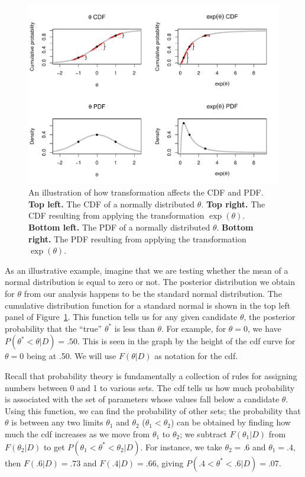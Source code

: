 \documentclass[man]{apa}
\begin{document}
\begin{figure}[t]
    \centering
    \includegraphics[width=.85\textwidth]{idunno.pdf}
    \caption{An illustration of how transformation affects the CDF and PDF. \textbf{Top left.} The CDF of a normally distributed $\theta$. \textbf{Top right.} The CDF resulting from applying the transformation $\exp(\theta)$. \textbf{Bottom left.} The PDF of a normally distributed $\theta$. \textbf{Bottom right.} The PDF resulting from applying the transformation $\exp(\theta)$.}
    \label{fig:normals}
\end{figure}

As an illustrative example, imagine that we are testing whether the mean of a normal distribution is equal to zero or not. The posterior distribution we obtain for $\theta$ from our analysis happens to be the standard normal distribution. The cumulative distribution function for a standard normal is shown in the top left panel of Figure~\ref{fig:normals}. This function tells us for any given candidate $\theta$, the posterior probability that the ``true'' $\theta^*$ is less than $\theta$. For example, for $\theta=0$, we have $P(\theta^*<\theta|D) = .50$. This is seen in the graph by the height of the cdf curve for $\theta=0$ being at .50. We will use $F(\theta|D)$ as notation for the cdf.

Recall that probability theory is fundamentally a collection of rules for assigning numbers between 0 and 1 to various sets. The cdf tells us how much probability is associated with the set of parameters whose values fall below a candidate $\theta$. Using this function, we can find the probability of other sets; the probability that $\theta$ is between any two limits $\theta_1$ and $\theta_2$ ($\theta_1<\theta_2$) can be obtained by finding how much the cdf increases as we move from $\theta_1$ to $\theta_2$; we subtract $F(\theta_1|D)$ from $F(\theta_2|D)$ to get $P(\theta_1<\theta^*<\theta_2|D)$. For instance, we take $\theta_2=.6$ and $\theta_1=.4$, then $F(.6|D)=.73$ and $F(.4|D)=.66$, giving $P(.4<\theta^*<.6|D)=.07$. 
\end{document}
